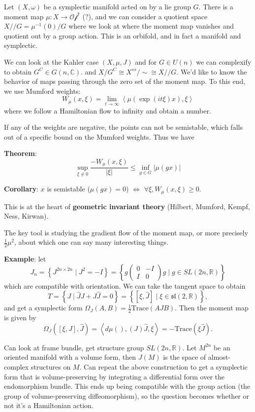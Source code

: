 Let \((X, \omega)\) be a symplectic manifold acted on by a lie group
\(G\). There is a moment map \(\mu: X \to \mathcal{Of}^*\) (?), and we
can consider a quotient space \(X//G = \mu^{-1}(0) / G\) where we look
at where the moment map vanishes and quotient out by a group action.
This is an orbifold, and in fact a manifold and symplectic.

We can look at the Kahler case \((X, \mu, J)\) and for \(G\in U(n)\) we
can complexify to obtain \(G^C\in G(n, \mathbb C)\). and
\(X/G^C \cong X^{ss}/\sim \cong X//G\). We'd like to know the behavior
of maps passing through the zero set of the moment map. To this end, we
use Mumford weights: \[
W_\mu(x, \xi) = \lim_{t\to\infty}\left< \mu (\exp(it\xi)x), \xi\right>
\] where we follow a Hamiltonian flow to infinity and obtain a number.

If any of the weights are negative, the points can not be semistable,
which falls out of a specific bound on the Mumford weights. Thus we have

\textbf{Theorem}: \[
\sup_{\xi\neq 0} \frac{-W_\mu(x,\xi)}{\left|\xi\right|} \leq \inf_{g\in G} \left|\mu(gx)\right|
\]

\textbf{Corollary}: \(x\) is semistable (\(\mu(gx) = 0\)) \(\iff\)
\(\forall\xi, W_\mu(x, \xi) \geq 0\).

This is at the heart of \textbf{geometric invariant theory} (Hilbert,
Mumford, Kempf, Ness, Kirwan).

The key tool is studying the gradient flow of the moment map, or more
precisely \(\frac 1 2 \mu^2\), about which one can say many interesting
things.

\textbf{Example}: let \[
J_n = \left\{ J^{2n\times 2n} \mid J^2 = -I \right\}
= \left\{ g \begin{pmatrix}0 & -I \\ I & 0\end{pmatrix} g \mid g\in SL(2n, \mathbb R)\right\}
\] which are compatible with orientation. We can take the tangent space
to obtain \[
T = \left\{ J \mid \hat J J + J\hat J = 0\right\} = \left\{ [\xi, \hat J] \mid \xi \in \mathfrak{sl}(2, \mathbb R)\right\},
\] and get a symplectic form
\(\Omega_J(A, B) = \frac 1 2 \mathrm{Trace}(AJB)\). Then the moment map
is given by \[
\Omega_J([\xi, J], \hat J) = \left< d\mu(), (J)\hat J, \xi\right> = -\mathrm{Trace}(\xi\hat J).
\]

Can look at frame bundle, get structure group \(SL(2n, \mathbb R)\). Let
\(M^{2n}\) be an oriented manifold with a volume form, then \(J(M)\) is
the space of almost-complex structures on \(M\). Can repeat the above
construction to get a symplectic form that is volume-preserving by
integrating a differential form over the endomorphism bundle. This ends
up being compatible with the group action (the group of
volume-preserving diffeomorphism), so the question becomes whether or
not it's a Hamiltonian action.

